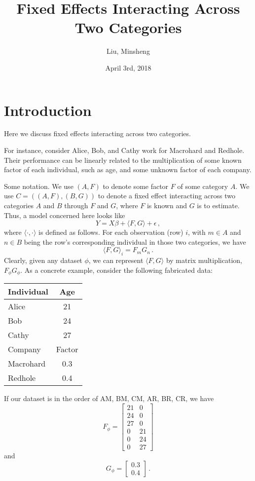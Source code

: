 \documentclass{tufte-handout}
\begin{document}
  \title{Fixed Effects Interacting Across Two Categories}
  \author{Liu, Minsheng}
  \date{April 3rd, 2018}
  \maketitle

  \section{Introduction}

  Here we discuss fixed effects interacting across two categories.

  For instance, consider Alice, Bob, and Cathy work for Macrohard and Redhole.
  Their performance can be linearly related to the multiplication of some known
  factor of each individual, such as age, and some unknown factor of each
  company.

  Some notation. We use $(A, F)$ to denote some factor $F$ of some category $A$.
  We use $C = ((A, F), (B, G))$ to denote a fixed effect interacting across
  two categories $A$ and $B$ through $F$ and $G$, where $F$ is known and $G$
  is to estimate. Thus, a model concerned here looks like
  \[
    Y = X \beta + \langle F, G \rangle + \epsilon \, ,
  \]
  where $\langle \cdot, \cdot \rangle$ is defined as follows.
  For each observation (row) $i$, with $m \in A$ and $n \in B$ being
  the row's corresponding individual in those two categories, we have
  \[
    \langle F, G \rangle_i = F_m G_n \, .
  \]
  Clearly, given any dataset $\phi$, we can represent $\langle F, G \rangle$
  by matrix multiplication, $F_\phi G_\phi$.
  As a concrete example, consider the following fabricated data:

  \begin{center}
    \begin{tabular}{l | c} \hline
      Individual & Age \\ \hline
      Alice & 21 \\
      Bob & 24 \\
      Cathy & 27 \\ \hline
      Company & Factor \\ \hline
      Macrohard & 0.3 \\
      Redhole & 0.4 \\ \hline
    \end{tabular}
  \end{center}

  If our dataset is in the order of AM, BM, CM, AR, BR, CR, we have
  \[
    F_{\phi} =
      \begin{bmatrix}
        21 & 0 \\
        24 & 0 \\
        27 & 0 \\
        0 & 21 \\
        0 & 24 \\
        0 & 27
      \end{bmatrix}
  \]
  and
  \[
    G_{\phi} =
      \begin{bmatrix}
        0.3 \\ 0.4
      \end{bmatrix} \, .
  \]
\end{document}
